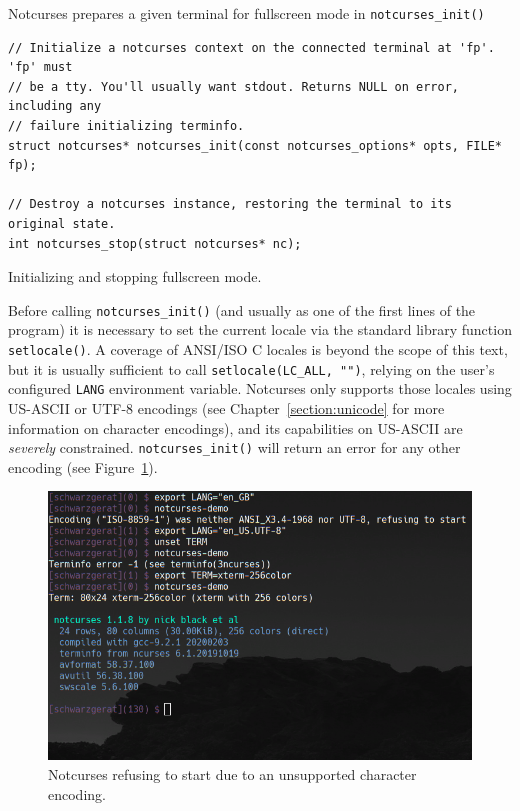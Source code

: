 \documentclass[letterpaper,10pt]{article}
\begin{document}
Notcurses prepares a given terminal for fullscreen mode in \texttt{notcurses\_init()}

\begin{listing}[!htb]
\begin{verbatim}
// Initialize a notcurses context on the connected terminal at 'fp'. 'fp' must
// be a tty. You'll usually want stdout. Returns NULL on error, including any
// failure initializing terminfo.
struct notcurses* notcurses_init(const notcurses_options* opts, FILE* fp);

// Destroy a notcurses instance, restoring the terminal to its original state.
int notcurses_stop(struct notcurses* nc);
\end{verbatim}
\caption{Initializing and stopping fullscreen mode.}
\end{listing}

Before calling \texttt{notcurses\_init()} (and usually as one of the first lines
of the program) it is necessary to set the current locale via the standard
library function \texttt{setlocale()}. A coverage of ANSI/ISO C locales is beyond
the scope of this text, but it is usually sufficient to call
\texttt{setlocale(LC\_ALL, "")}, relying on the user's configured \texttt{LANG}
environment variable. Notcurses only supports those locales using
US-ASCII or UTF-8 encodings (see Chapter~\ref{section:unicode} for more
information on character encodings), and its capabilities on US-ASCII
are \textit{severely} constrained. \texttt{notcurses\_init()} will return an
error for any other encoding (see Figure~\ref{fig:encodingfail}).

\begin{figure}[!htb]
\centering \includegraphics[width=.7\linewidth]{media/notcurses-init-fails.png}
\caption{Notcurses refusing to start due to an unsupported character encoding.}
\label{fig:encodingfail}
\end{figure}
\end{document}
